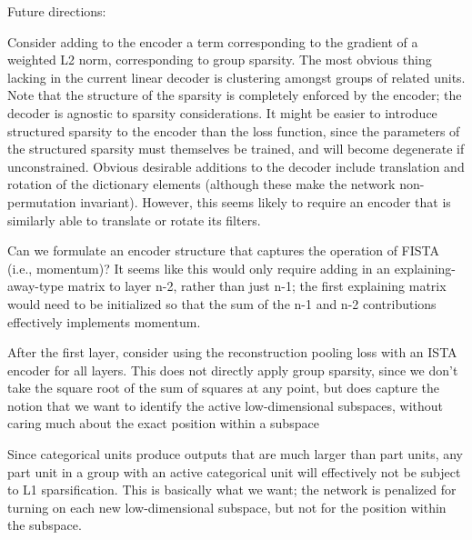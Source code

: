 Future directions:

Consider adding to the encoder a term corresponding to the gradient of a weighted L2 norm, corresponding to group sparsity.  The most obvious thing lacking in the current linear decoder is clustering amongst groups of related units.  Note that the structure of the sparsity is completely enforced by the encoder; the decoder is agnostic to sparsity considerations.  It might be easier to introduce structured sparsity to the encoder than the loss function, since the parameters of the structured sparsity must themselves be trained, and will become degenerate if unconstrained.
Obvious desirable additions to the decoder include translation and rotation of the dictionary elements (although these make the network non-permutation invariant).  However, this seems likely to require an encoder that is similarly able to translate or rotate its filters.

Can we formulate an encoder structure that captures the operation of FISTA (i.e., momentum)?  It seems like this would only require adding in an explaining-away-type matrix to layer n-2, rather than just n-1; the first explaining matrix would need to be initialized so that the sum of the n-1 and n-2 contributions effectively implements momentum. 

After the first layer, consider using the reconstruction pooling loss with an ISTA encoder for all layers.  This does not directly apply group sparsity, since we don't take the square root of the sum of squares at any point, but does capture the notion that we want to identify the active low-dimensional subspaces, without caring much about the exact position within a subspace

Since categorical units produce outputs that are much larger than part units, any part unit in a group with an active categorical unit will effectively not be subject to L1 sparsification.  This is basically what we want; the network is penalized for turning on each new low-dimensional subspace, but not for the position within the subspace.  

